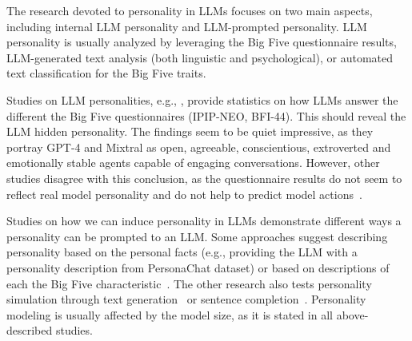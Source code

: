 The research devoted to personality in LLMs focuses on two main aspects, including internal LLM personality and LLM-prompted personality. LLM personality is usually analyzed by leveraging the Big Five questionnaire results, LLM-generated text analysis (both linguistic and psychological), or automated text classification for the Big Five traits.

Studies on LLM personalities, e.g., \cite{sorokovikova2024llms}, provide statistics on how LLMs answer the different the Big Five questionnaires (IPIP-NEO, BFI-44). This should reveal the LLM hidden personality. The findings seem to be quiet impressive, as they portray GPT-4 and Mixtral as open, agreeable, conscientious, extroverted and emotionally stable agents capable of engaging conversations. However, other studies disagree with this conclusion, as the questionnaire results do not seem to reflect real model personality and do not help to predict model actions~\cite{ai2024cognition}.

Studies on how we can induce personality in LLMs demonstrate different ways a personality can be prompted to an LLM. Some approaches suggest describing personality based on the personal facts (e.g., providing the LLM with a personality description from PersonaChat dataset) or based on descriptions of each the Big Five characteristic~\cite{serapiogarcía2023personality, liu2024dynamic}. The other research also tests personality simulation through text generation~\cite{jiang2024evaluating} or sentence completion~\cite{hilliard2024eliciting}. Personality modeling is usually affected by the model size, as it is stated in all above-described studies. 
% 
